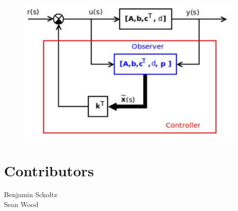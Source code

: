 \documentclass[a4paper, 10pt, titlepage]{article}
\begin{document}
\begin{paracol}{2}[]
\begin{figure}
\begin{center}
\includegraphics[scale=0.4]{observer-statef.pdf}
\end{center}
\end{figure}

\end{paracol}

\newpage

\pagestyle{fancy}
\fancyhf{}





\section*{Contributors}
Benjamin Scholtz\\
Sean Wood







\end{document}

